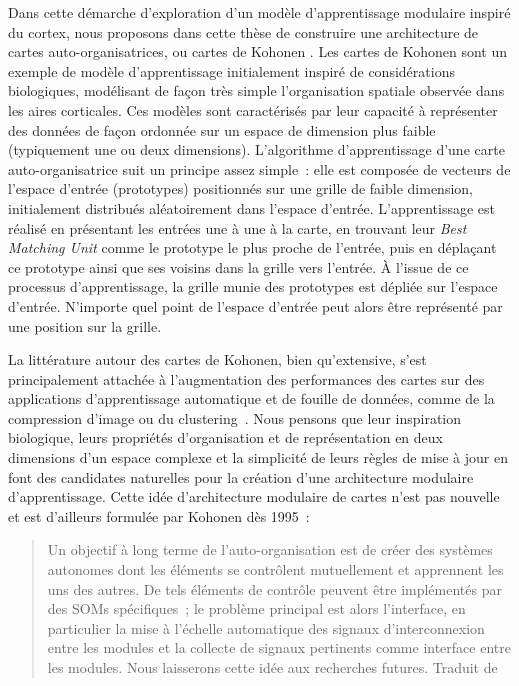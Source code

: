 Dans cette démarche d'exploration d'un modèle d'apprentissage modulaire inspiré du cortex, nous proposons dans cette thèse de construire une architecture de cartes auto-organisatrices, ou cartes de Kohonen \parencite{Kohonen1982}.
Les cartes de Kohonen  sont un exemple de modèle d'apprentissage initialement inspiré de considérations biologiques, modélisant de façon très simple l'organisation spatiale observée dans les aires corticales.
Ces modèles sont caractérisés par leur capacité à représenter des données de façon ordonnée sur un espace de dimension plus faible (typiquement une ou deux dimensions).
L'algorithme d'apprentissage d'une carte auto-organisatrice suit un principe assez simple~: elle est composée de vecteurs de l'espace d'entrée (prototypes) positionnés sur une grille de faible dimension, initialement distribués aléatoirement dans l'espace d'entrée. L'apprentissage est réalisé en présentant les entrées une à une à la carte, en trouvant leur \emph{Best Matching Unit} comme le prototype le plus proche de l'entrée, puis en déplaçant ce prototype ainsi que ses voisins dans la grille vers l'entrée.
\`A l'issue de ce processus d'apprentissage, la grille munie des prototypes est dépliée sur l'espace d'entrée. N'importe quel point de l'espace d'entrée peut alors être représenté par une position sur la grille. 

La littérature autour des cartes de Kohonen, bien qu'extensive, s'est principalement attachée à l'augmentation des performances des cartes sur des applications d'apprentissage automatique et de fouille de données, comme de la compression d'image ou du clustering~\parencite{kohonen_essentials_2013}.
Nous pensons que leur inspiration biologique, leurs propriétés d'organisation et de représentation en deux dimensions d'un espace complexe et la simplicité de leurs règles de mise à jour en font des candidates naturelles pour la création d'une architecture modulaire d'apprentissage.
Cette idée d'architecture modulaire de cartes n'est pas nouvelle et est d'ailleurs formulée par Kohonen dès 1995~:
\begin{quote}
Un objectif à long terme de l'auto-organisation est de créer des systèmes autonomes dont les éléments se contrôlent mutuellement et apprennent les uns des autres. De tels éléments de contrôle peuvent être implémentés par des SOMs spécifiques~; le problème principal est alors l'interface, en particulier la mise à l'échelle automatique des signaux d'interconnexion entre les modules et la collecte de signaux pertinents comme interface entre les modules. Nous laisserons cette idée aux recherches futures.
Traduit de \cite{Kohonen1995SelfOrganizingM}
\end{quote}

